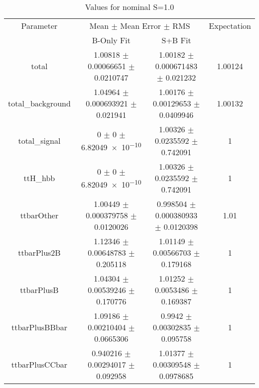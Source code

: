 \begin{table}
\centering
\caption{Values for nominal S=1.0}
\begin{tabular}{cccc}
\toprule
Parameter & \multicolumn{2}{c}{Mean $\pm$ Mean Error $\pm$ RMS} & Expectation\\
 & B-Only Fit & S+B Fit & \\
\midrule
total & \num{1.00818} $\pm$ \num{0.00066651} $\pm$ \num{0.0210747} & \num{1.00182} $\pm$ \num{0.000671483} $\pm$ \num{0.021232} & \num{1.00124}\\
total\_background & \num{1.04964} $\pm$ \num{0.000693921} $\pm$ \num{0.021941} & \num{1.00176} $\pm$ \num{0.00129653} $\pm$ \num{0.0409946} & \num{1.00132}\\
total\_signal & \num{0} $\pm$ \num{0} $\pm$ \num{6.82049e-10} & \num{1.00326} $\pm$ \num{0.0235592} $\pm$ \num{0.742091} & \num{1}\\
ttH\_hbb & \num{0} $\pm$ \num{0} $\pm$ \num{6.82049e-10} & \num{1.00326} $\pm$ \num{0.0235592} $\pm$ \num{0.742091} & \num{1}\\
ttbarOther & \num{1.00449} $\pm$ \num{0.000379758} $\pm$ \num{0.0120026} & \num{0.998504} $\pm$ \num{0.000380933} $\pm$ \num{0.0120398} & \num{1.01}\\
ttbarPlus2B & \num{1.12346} $\pm$ \num{0.00648783} $\pm$ \num{0.205118} & \num{1.01149} $\pm$ \num{0.00566703} $\pm$ \num{0.179168} & \num{1}\\
ttbarPlusB & \num{1.04304} $\pm$ \num{0.00539246} $\pm$ \num{0.170776} & \num{1.01252} $\pm$ \num{0.0053486} $\pm$ \num{0.169387} & \num{1}\\
ttbarPlusBBbar & \num{1.09186} $\pm$ \num{0.00210404} $\pm$ \num{0.0665306} & \num{0.9942} $\pm$ \num{0.00302835} $\pm$ \num{0.095758} & \num{1}\\
ttbarPlusCCbar & \num{0.940216} $\pm$ \num{0.00294017} $\pm$ \num{0.092958} & \num{1.01377} $\pm$ \num{0.00309548} $\pm$ \num{0.0978685} & \num{1}\\
\bottomrule
\end{tabular}
\end{table}